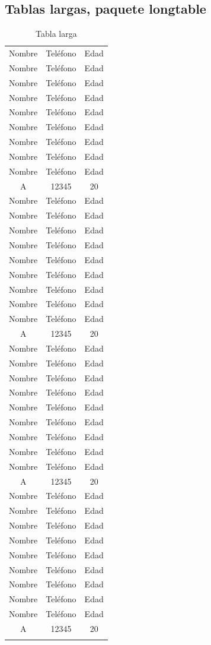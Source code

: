\documentclass[12pt]{article}
\begin{document}
\subsection{Tablas largas, paquete longtable}
\begin{longtable}[c]{|ccc|}
Nombre & Teléfono & Edad \\
Nombre & Teléfono & Edad \\
Nombre & Teléfono & Edad \\
Nombre & Teléfono & Edad \\
Nombre & Teléfono & Edad \\
Nombre & Teléfono & Edad \\
Nombre & Teléfono & Edad \\
Nombre & Teléfono & Edad \\
Nombre & Teléfono & Edad \\
A & 12345 & 20 \\
Nombre & Teléfono & Edad \\
Nombre & Teléfono & Edad \\
Nombre & Teléfono & Edad \\
Nombre & Teléfono & Edad \\
Nombre & Teléfono & Edad \\
Nombre & Teléfono & Edad \\
Nombre & Teléfono & Edad \\
Nombre & Teléfono & Edad \\
Nombre & Teléfono & Edad \\
A & 12345 & 20 \\
Nombre & Teléfono & Edad \\
Nombre & Teléfono & Edad \\
Nombre & Teléfono & Edad \\
Nombre & Teléfono & Edad \\
Nombre & Teléfono & Edad \\
Nombre & Teléfono & Edad \\
Nombre & Teléfono & Edad \\
Nombre & Teléfono & Edad \\
Nombre & Teléfono & Edad \\
A & 12345 & 20 \\
Nombre & Teléfono & Edad \\
Nombre & Teléfono & Edad \\
Nombre & Teléfono & Edad \\
Nombre & Teléfono & Edad \\
Nombre & Teléfono & Edad \\
Nombre & Teléfono & Edad \\
Nombre & Teléfono & Edad \\
Nombre & Teléfono & Edad \\
Nombre & Teléfono & Edad \\
A & 12345 & 20 \\
\caption{Tabla larga}
\label{TablaLargaEjemplo}
\end{longtable}
\end{document}
